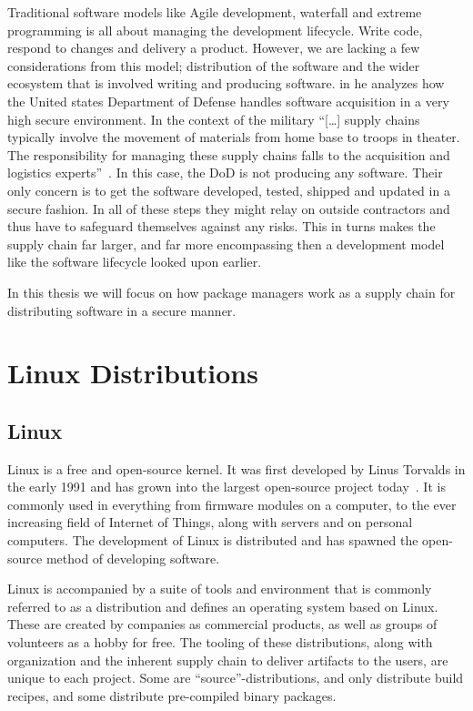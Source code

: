 \documentclass[../Main/thesis.tex]{subfiles}
\begin{document}
Traditional software models like Agile development, waterfall and extreme
programming is all about managing the development lifecycle. Write code, respond
to changes and delivery a product. However, we are lacking a few considerations
from this model; distribution of the software and the wider ecosystem that is
involved writing and producing software. \citeauthor{rj-ellison-2010} in
 he analyzes how the United states Department of
Defense handles software acquisition in a very high secure environment. In the
context of the military ``[\dots] supply chains typically involve the movement
of materials from home base to troops in theater. The responsibility for
managing these supply chains falls to the acquisition and logistics
experts''~\cite{rj-ellison-2010}. In this case, the DoD is not producing any
software. Their only concern is to get the software developed, tested, shipped
and updated in a secure fashion. In all of these steps they might relay on
outside contractors and thus have to safeguard themselves against any risks.
This in turns makes the supply chain far larger, and far more encompassing then
a development model like the software lifecycle looked upon earlier.

In this thesis we will focus on how package managers work as a supply chain for
distributing software in a secure manner.

\section{Linux Distributions}\label{sec:linux_distributions}
\subsection*{Linux}
Linux is a free and open-source kernel. It was first developed by Linus Torvalds
in the early 1991 and has grown into the largest open-source project
today~\cite{linuxfoundation-linux}. It is commonly used in everything from
firmware modules on a computer, to the ever increasing field of Internet of
Things, along with servers and on personal computers. The development of Linux is
distributed and has spawned the open-source method of developing software.

Linux is accompanied by a suite of tools and environment that is commonly
referred to as a distribution and defines an operating system based on
Linux. These are created by companies as commercial products, as well as groups
of volunteers as a hobby for free. The tooling of these distributions, along
with organization and the inherent supply chain to deliver artifacts to the
users, are unique to each project. Some are ``source''-distributions, and only
distribute build recipes, and some distribute pre-compiled binary packages.
\end{document}
